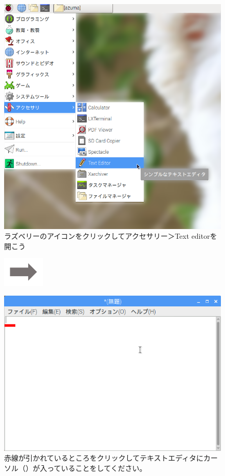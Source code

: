 \begin{figure}[ht]
  \begin{minipage}{0.3\textwidth}
    \includegraphics[width=\linewidth]{text01-img/textbook-img064.png}
     ラズベリーのアイコンをクリックしてアクセサリー＞Text editorを開こう
  \end{minipage}
  \includegraphics[width=2cm]{text01-img/textbook-img053.png}
  \begin{minipage}{0.4\textwidth}
    \includegraphics[width=\linewidth]{text01-img/textbook-img063.png}
     赤線が引かれているところをクリックしてテキストエディタにカーソル（）が入っていることをしてください。
  \end{minipage}


\end{figure}
